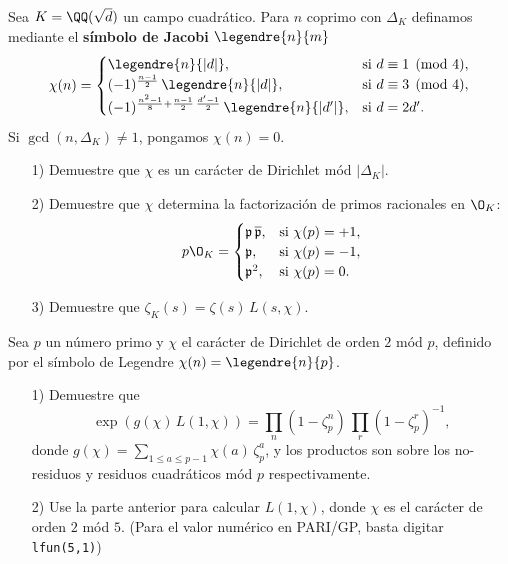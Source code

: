 \begin{ejercicio}
  \label{ejerc:caracter-para-campo-cuadratico}
  Sea $K = \QQ (\sqrt{d})$ un campo cuadrático. Para $n$ coprimo con $\Delta_K$
  definamos mediante el \textbf{símbolo de Jacobi} $\legendre{n}{m}$
  \[ \chi (n) = \begin{cases}
    \legendre{n}{|d|}, & \text{si }d \equiv 1 \pmod{4},\\
    (-1)^{\frac{n-1}{2}}\,\legendre{n}{|d|}, & \text{si }d \equiv 3 \pmod{4},\\
    (-1)^{\frac{n^2-1}{8} + \frac{n-1}{2}\,\frac{d'-1}{2}}\,\legendre{n}{|d'|}, & \text{si }d = 2d'.
  \end{cases} \]
  Si $\gcd (n,\Delta_K) \ne 1$, pongamos $\chi (n) = 0$.

  \begin{enumerate}
  \item[1)] Demuestre que $\chi$ es un carácter de Dirichlet mód $|\Delta_K|$.

  \item[2)] Demuestre que $\chi$ determina la factorización de primos
    racionales en $\O_K$:
    \[ p\O_K = \begin{cases}
      \mathfrak{p}\,\overline{\mathfrak{p}}, & \text{si } \chi (p) = +1,\\
      \mathfrak{p}, & \text{si } \chi (p) = -1,\\
      \mathfrak{p}^2, & \text{si } \chi (p) = 0.
    \end{cases} \]

  \item[3)] Demuestre que $\zeta_K (s) = \zeta (s) \, L (s,\chi)$.
  \end{enumerate}
\end{ejercicio}

\begin{ejercicio}
  \label{ejerc:L-series-caracter-cuadratico-mod-p}
  Sea $p$ un número primo y $\chi$ el carácter de Dirichlet de orden $2$ mód
  $p$, definido por el símbolo de Legendre $\chi (n) = \legendre{n}{p}$.

  \begin{enumerate}
  \item[1)] Demuestre que
    $$\exp (g (\chi)\,L (1,\chi)) = \prod_n (1 - \zeta_p^n)\,\prod_r (1 - \zeta_p^r)^{-1},$$
    donde $g (\chi) = \sum_{1 \le a
      \le p-1} \chi (a)\,\zeta_p^a$, y los productos son sobre los no-residuos y
    residuos cuadráticos mód $p$ respectivamente.

  \item[2)] Use la parte anterior para calcular $L (1,\chi)$, donde $\chi$ es el
    carácter de orden $2$ mód $5$.  (Para el valor numérico en PARI/GP, basta
    digitar \texttt{lfun(5,1)})
  \end{enumerate}
\end{ejercicio}

